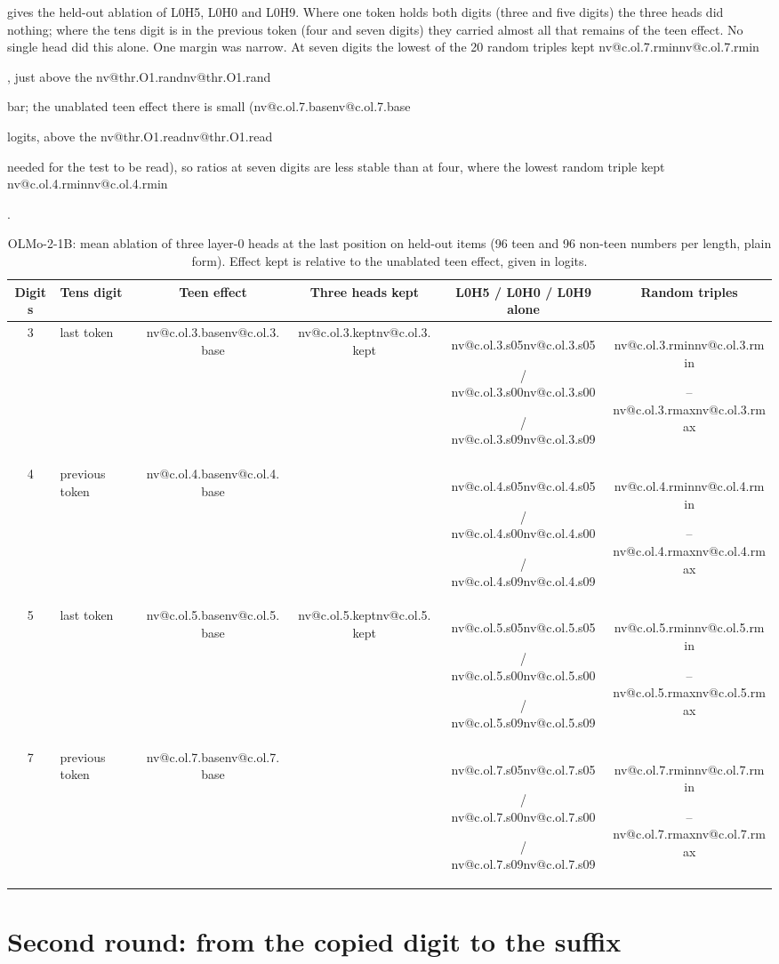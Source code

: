 \documentclass[11pt]{article}
\makeatletter
\newcommand{\nv}[1]{\ifcsname nv@#1\endcsname\csname nv@#1\endcsname\else\PackageError{numbers}{Unknown number key #1}{}\fi}
\newcommand{\ol}{OLMo-2-1B}
\newcommand{\hd}[2]{L#1H#2}
\makeatother
\begin{document}
 gives the held-out ablation of \hd{0}{5}, \hd{0}{0} and \hd{0}{9}. Where one token holds both digits (three and five digits) the three heads did nothing; where the tens digit is in the previous token (four and seven digits) they carried almost all that remains of the teen effect. No single head did this alone. One margin was narrow. At seven digits the lowest of the 20 random triples kept \nv{c.ol.7.rmin}, just above the \nv{thr.O1.rand} bar; the unablated teen effect there is small (\nv{c.ol.7.base} logits, above the \nv{thr.O1.read} needed for the test to be read), so ratios at seven digits are less stable than at four, where the lowest random triple kept \nv{c.ol.4.rmin}.

\begin{table}[t]
\centering\small
\caption{\ol{}: mean ablation of three layer-0 heads at the last position on held-out items (96 teen and 96 non-teen numbers per length, plain form). Effect kept is relative to the unablated teen effect, given in logits.}
\label{tab:olmoabl}
\begin{tabular}{@{}c l c c c c@{}}
\toprule
Digits & Tens digit & Teen effect & Three heads kept & \hd{0}{5} / \hd{0}{0} / \hd{0}{9} alone & Random triples \\
\midrule
3 & last token & \nv{c.ol.3.base} & \nv{c.ol.3.kept} & \nv{c.ol.3.s05} / \nv{c.ol.3.s00} / \nv{c.ol.3.s09} & \nv{c.ol.3.rmin}--\nv{c.ol.3.rmax} \\
4 & previous token & \nv{c.ol.4.base} & \textbf{\nv{c.ol.4.kept}} & \nv{c.ol.4.s05} / \nv{c.ol.4.s00} / \nv{c.ol.4.s09} & \nv{c.ol.4.rmin}--\nv{c.ol.4.rmax} \\
5 & last token & \nv{c.ol.5.base} & \nv{c.ol.5.kept} & \nv{c.ol.5.s05} / \nv{c.ol.5.s00} / \nv{c.ol.5.s09} & \nv{c.ol.5.rmin}--\nv{c.ol.5.rmax} \\
7 & previous token & \nv{c.ol.7.base} & \textbf{\nv{c.ol.7.kept}} & \nv{c.ol.7.s05} / \nv{c.ol.7.s00} / \nv{c.ol.7.s09} & \nv{c.ol.7.rmin}--\nv{c.ol.7.rmax} \\
\bottomrule
\end{tabular}
\end{table}

\section{Second round: from the copied digit to the suffix}
\label{sec:depth}
\end{document}
